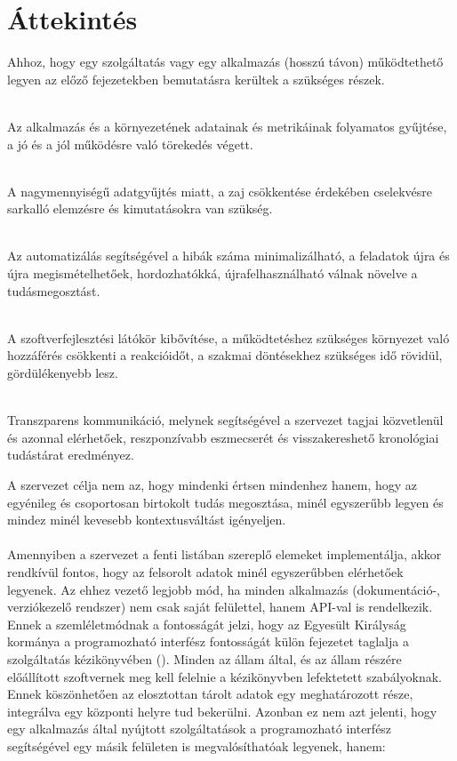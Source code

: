 
\section{Áttekintés}
\label{sect:futureops_overview}
Ahhoz, hogy egy szolgáltatás vagy egy alkalmazás (hosszú távon) működtethető legyen az előző fejezetekben bemutatásra kerültek a szükséges részek.

\begin{description}
  \label{dsc:important_stuffs}
  \item[Folyamatos adatgyűjtés és értesítés]\hfill\\
  Az alkalmazás és a környezetének adatainak és metrikáinak folyamatos gyűjtése, a jó és a jól működésre való törekedés végett.
  \item[Gyűjtött adatok elemzése]\hfill\\
  A nagymennyiségű adatgyűjtés miatt, a zaj csökkentése érdekében cselekvésre sarkalló elemzésre és kimutatásokra van szükség.
  \item[Automatizált folyamatok]\hfill\\
  Az automatizálás segítségével a hibák száma minimalizálható, a feladatok újra és újra megismételhetőek, hordozhatókká, újrafelhasználható válnak növelve a tudásmegosztást.
  \item[A rendszerek közti kapcsolatok megértése]\hfill\\
  A szoftverfejlesztési látókör kibővítése, a működtetéshez szükséges környezet való hozzáférés csökkenti a reakcióidőt, a szakmai döntésekhez szükséges idő rövidül, gördülékenyebb lesz.
  \item[Transzparens kommunikáció]\hfill\\
  Transzparens kommunikáció, melynek segítségével a szervezet tagjai közvetlenül és azonnal elérhetőek, reszponzívabb eszmecserét és visszakereshető kronológiai tudástárat eredményez.
\end{description}

{\Large A szervezet célja nem az, hogy mindenki értsen mindenhez hanem, hogy az egyénileg és csoportosan birtokolt tudás megosztása, minél egyszerűbb legyen és mindez minél kevesebb kontextusváltást igényeljen.\\}
\hfill\\
Amennyiben a szervezet a fenti listában szereplő elemeket implementálja, akkor rendkívül fontos, hogy az felsorolt adatok minél egyszerűbben elérhetőek legyenek. Az ehhez vezető legjobb mód, ha minden alkalmazás (dokumentáció-, verziókezelő rendszer) nem csak saját felülettel, hanem API-val is rendelkezik. Ennek a szemléletmódnak a fontosságát jelzi, hogy az Egyesült Királyság kormánya a programozható interfész fontosságát külön fejezetet taglalja a szolgáltatás kézikönyvében (\cite{uk_gov_build_api}). Minden az állam által, és az állam részére előállított szoftvernek meg kell felelnie a kézikönyvben lefektetett szabályoknak. Ennek köszönhetően az elosztottan tárolt adatok egy meghatározott része, integrálva egy központi helyre tud bekerülni. Azonban ez nem azt jelenti, hogy egy alkalmazás által nyújtott szolgáltatások a programozható interfész segítségével egy másik felületen is megvalósíthatóak legyenek, hanem:

